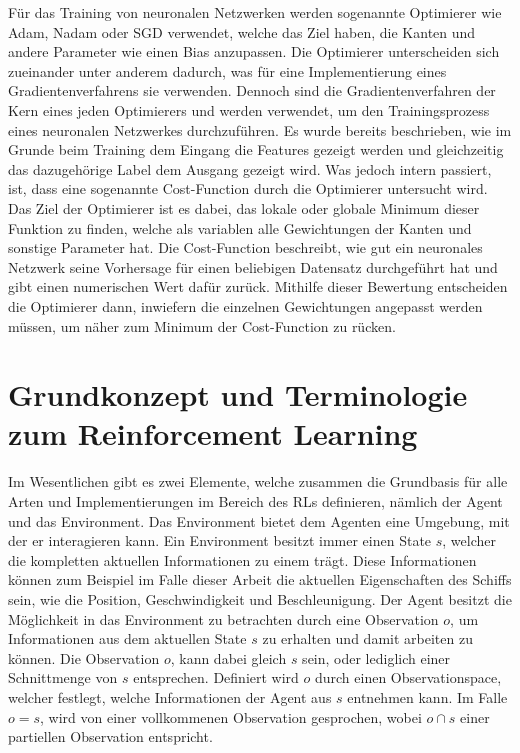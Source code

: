 \documentclass[]{iat}
\begin{document}
Für das Training von neuronalen Netzwerken werden sogenannte Optimierer wie Adam, Nadam oder SGD verwendet, welche das Ziel haben, die Kanten und andere Parameter wie einen Bias anzupassen. Die Optimierer unterscheiden sich zueinander unter anderem dadurch, was für eine Implementierung eines Gradientenverfahrens sie verwenden. Dennoch sind die Gradientenverfahren der Kern eines jeden Optimierers und werden verwendet, um den Trainingsprozess eines neuronalen Netzwerkes durchzuführen. Es wurde bereits beschrieben, wie im Grunde beim Training dem Eingang die Features gezeigt werden und gleichzeitig das dazugehörige Label dem Ausgang gezeigt wird. Was jedoch intern passiert, ist, dass eine sogenannte Cost-Function durch die Optimierer untersucht wird. Das Ziel der Optimierer ist es dabei, das lokale oder globale Minimum dieser Funktion zu finden, welche als variablen alle Gewichtungen der Kanten und sonstige Parameter hat. Die Cost-Function beschreibt, wie gut ein neuronales Netzwerk seine Vorhersage für einen beliebigen Datensatz durchgeführt hat und gibt einen numerischen Wert dafür zurück. Mithilfe dieser Bewertung entscheiden die Optimierer dann, inwiefern die einzelnen Gewichtungen angepasst werden müssen, um näher zum Minimum der Cost-Function zu rücken. \cite[]{KrusComp2015}

\newpage
\section{Grundkonzept und Terminologie zum Reinforcement Learning} \label{sec:grundkonzept_rf}
Im Wesentlichen gibt es zwei Elemente, welche zusammen die Grundbasis für alle Arten und Implementierungen im Bereich des RLs definieren, nämlich der Agent und das Environment. Das Environment bietet dem Agenten eine Umgebung, mit der er interagieren kann. Ein Environment besitzt immer einen State $s$, welcher die kompletten aktuellen Informationen zu einem trägt. Diese Informationen können zum Beispiel im Falle dieser Arbeit die aktuellen Eigenschaften des Schiffs sein, wie die Position, Geschwindigkeit und Beschleunigung. Der Agent besitzt die Möglichkeit in das Environment zu betrachten durch eine Observation $o$, um Informationen aus dem aktuellen State $s$ zu erhalten und damit arbeiten zu können. Die Observation $o$, kann dabei gleich $s$ sein, oder lediglich einer Schnittmenge von $s$ entsprechen. Definiert wird $o$ durch einen Observationspace, welcher festlegt, welche Informationen der Agent aus $s$ entnehmen kann. Im Falle $o=s$, wird von einer vollkommenen Observation gesprochen, wobei $o \cap s$ einer partiellen Observation entspricht. \cite[]{SpinningUp2018} \cite[]{Sutton1998}
\end{document}
